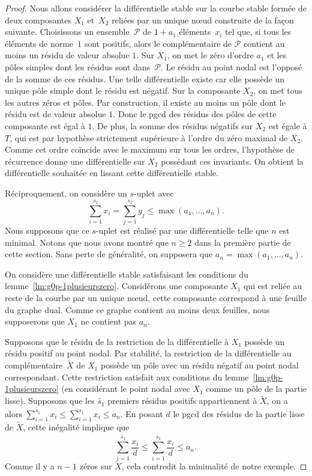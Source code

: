 \begin{proof}
Nous allons considérer la différentielle stable sur la courbe stable formée de deux composantes $X_{1}$ et~$X_{2}$ reliées par un unique nœud construite de la façon suivante. Choisissons un ensemble~$\mathcal{P}$ de $1 + a_1$ éléments~$x_{i}$ tel que, si tous les éléments de norme~$1$ sont positifs, alors le complémentaire de $\mathcal{P}$ contient au moins un résidu de valeur absolue $1$. Sur $X_1$, on met le zéro d’ordre $a_1$ et les pôles simples dont les résidus sont dans~$\mathcal{P}$. Le résidu au point nodal est l'opposé de la somme de ces résidus. Une telle différentielle existe car elle possède un unique pôle simple dont
le résidu est négatif. Sur la composante $X_2$, on met tous les autres zéros et pôles. Par construction, il existe au moins un pôle dont le résidu est de valeur absolue $1$. Donc le pgcd des résidus des pôles de cette composante est égal à $1$. De plus, la somme des résidus négatifs sur $X_{2}$ est égale à $T$, qui est par hypothèse strictement
supérieure à l'ordre du zéro maximal de $X_{2}$. Comme cet ordre coïncide avec le maximum sur tous les ordres, l’hypothèse de récurrence donne une différentielle sur $X_{2}$ possédant ces invariants. On obtient la différentielle souhaitée en lissant cette différentielle stable.

Réciproquement, on considère un $s$-uplet avec\vspace*{-3pt}
\[
\sum_{i=1}^{s_{1}} x_{i} = \sum_{j=1}^{s_{2}} y_{j} \leq \max(a_{1},\dots,a_{n}).
\]
Nous supposons que ce $s$-uplet est réalisé par une différentielle telle que $n$ est minimal. Notons que nous avons montré que $n\geq2$ dans la première partie de cette section. Sans perte de généralité, on supposera que $a_{n}= \max(a_{1},\dots,a_{n})$.

On considère une différentielle stable satisfaisant les conditions du lemme~\ref{lm:g0p-1plusieurszero}. Considérons une composante $X_{1}$ qui est reliée au reste de la courbe par un unique nœud, \ie cette composante correspond à une feuille du graphe dual. Comme ce graphe contient au moins deux feuilles, nous supposerons que $X_{1}$ ne contient pas $a_{n}$.

Supposons que le résidu de la restriction de la différentielle à $X_{1}$ possède un résidu positif au point nodal. Par stabilité, la restriction de la différentielle au complémentaire~$\tilde X$ de $X_{1}$ possède un pôle avec un résidu négatif au point nodal correspondant. Cette restriction satisfait aux conditions du lemme~\ref{lm:g0p-1plusieurszero} (en considérant le point nodal avec $X_{1}$ comme un pôle de la partie lisse). Supposons que les $\tilde{s_{1}}$ premiers résidus positifs appartiennent à $\tilde X$, on a alors $\sum_{i=1}^{\tilde{s_{1}}} x_{i} \leq \sum_{i=1}^{s_{1}} x_{i} \leq a_{n}$. En posant $d$ le pgcd des résidus de la partie lisse de $\tilde{X}$, cette inégalité implique que\vspace*{-3pt}
\[
\sum_{i=1}^{\tilde{s_{1}}} \frac{x_{i}}{d} \leq \sum_{i=1}^{s_{1}} \frac{x_{i}}{d} \leq a_{n}.
\]
Comme il y a $n-1$ zéros sur $\tilde X$, cela contredit la minimalité de notre exemple.
\end{proof}

